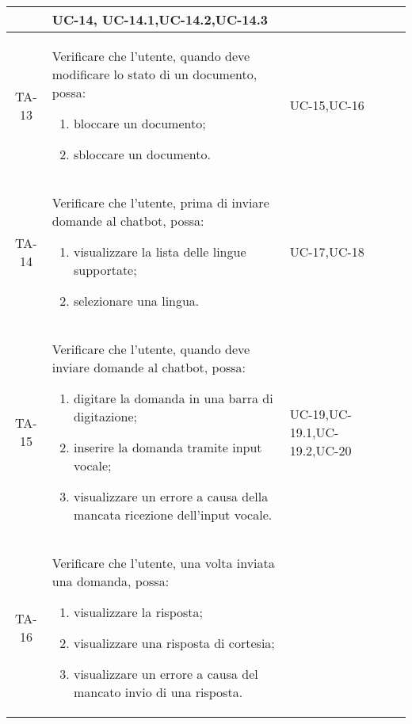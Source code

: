 \begin{xltabular}{\textwidth}{| c | X | X | c |}
\begin{enumerate}
    \end{enumerate}& UC-14, \newline UC-14.1,\newline UC-14.2,\newline UC-14.3 & \textcolor{xmarkcolor}{} \\
    \hline

    TA-13 & Verificare che l’utente, quando deve modificare lo stato di un documento, possa:
    \begin{enumerate}
        \item bloccare un documento;
        \item sbloccare un documento.
        
    \end{enumerate}& UC-15,\newline UC-16 & \textcolor{xmarkcolor}{} \\
    \hline
    
    TA-14 & Verificare che l’utente, prima di inviare domande al chatbot, possa:
    \begin{enumerate}
        \item visualizzare la lista delle lingue supportate;
        \item selezionare una lingua.
        
    \end{enumerate}& UC-17,\newline UC-18 & \textcolor{xmarkcolor}{} \\
    \hline

    TA-15 & Verificare che l’utente, quando deve inviare domande al chatbot, possa:
    \begin{enumerate}
        \item digitare la domanda in una barra di digitazione;
        \item inserire la domanda tramite input vocale;
        \item visualizzare un errore a causa della mancata ricezione dell'input vocale.
        
    \end{enumerate}& UC-19,\newline UC-19.1,\newline UC-19.2,\newline UC-20 & \textcolor{xmarkcolor}{} \\
    \hline
    TA-16 & Verificare che l’utente, una volta inviata una domanda, possa:
    \begin{enumerate}
        \item visualizzare la risposta;
        \item visualizzare una risposta di cortesia;
        \item visualizzare un errore a causa del mancato invio di una risposta.


\end{enumerate}
\end{xltabular}
